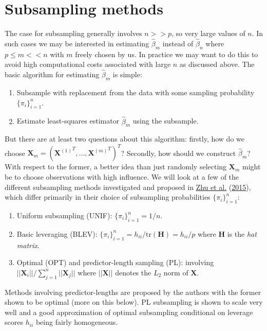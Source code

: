 \documentclass[
]{book}
\providecommand{\tightlist}{%
  \setlength{\itemsep}{0pt}\setlength{\parskip}{0pt}}
\begin{document}
\hypertarget{subsampling}{%
\section{Subsampling methods}\label{subsampling}}

The case for subsampling generally involves \(n >> p\), so very large values of \(n\). In such cases we may be interested in estimating \(\hat\beta_m\) instead of \(\hat\beta_n\) where \(p\le m<<n\) with \(m\) freely chosen by us. In practice we may want to do this to avoid high computational costs associated with large \(n\) as discussed above. The basic algorithm for estimating \(\hat\beta_m\) is simple:

\begin{enumerate}
\def\labelenumi{\arabic{enumi}.}
\tightlist
\item
  Subsample with replacement from the data with some sampling probability \(\{\pi_i\}^n_{i=1}\).
\item
  Estimate least-squares estimator \(\hat\beta_m\) using the subsample.
\end{enumerate}

But there are at least two questions about this algorithm: firstly, how do we choose \(\mathbf{X}_m=({\mathbf{X}^{(1)}}^T,...,{\mathbf{X}^{(m)}}^T)^T\)? Secondly, how should we construct \(\hat\beta_m\)? With respect to the former, a better idea than just randomly selecting \(\mathbf{X}_m\) might be to choose observations with high influence. We will look at a few of the different subsampling methods investigated and proposed in \protect\hyperlink{ref-zhu2015optimal}{Zhu et al.} (\protect\hyperlink{ref-zhu2015optimal}{2015}), which differ primarily in their choice of subsampling probabilities \(\{\pi_i\}^n_{i=1}\):

\begin{enumerate}
\def\labelenumi{\arabic{enumi}.}
\tightlist
\item
  Uniform subsampling (UNIF): \(\{\pi_i\}^n_{i=1}=1/n\).
\item
  Basic leveraging (BLEV): \(\{\pi_i\}^n_{i=1}=h_{ii}/ \text{tr}(\mathbf{H})=h_{ii}/p\) where \(\mathbf{H}\) is the \emph{hat matrix}.
\item
  Optimal (OPT) and predictor-length sampling (PL): involving \(||\mathbf{X}_i||/ \sum_{j=1}^{n}||\mathbf{X}_j||\) where \(||\mathbf{X}||\) denotes the \(L_2\) norm of \(\mathbf{X}\).
\end{enumerate}

Methods involving predictor-lengths are proposed by the authors with the former shown to be optimal (more on this below). PL subsampling is shown to scale very well and a good approximation of optimal subsampling conditional on leverage scores \(h_{ii}\) being fairly homogeneous.
\end{document}
